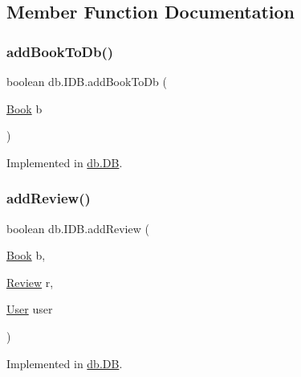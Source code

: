 \subsection{Member Function Documentation}
\mbox{\label{interfacedb_1_1_i_d_b_a63904b26597f651ea6acbd03384e0afb}} 
\subsubsection{\texorpdfstring{add\+Book\+To\+Db()}{addBookToDb()}}
{\footnotesize\ttfamily boolean db.\+I\+D\+B.\+add\+Book\+To\+Db (\begin{DoxyParamCaption}\item[{\hyperlink{classserver_1_1data_1_1_book}{Book}}]{b }\end{DoxyParamCaption})}



Implemented in \hyperlink{classdb_1_1_d_b_a705ed9c0ffae567ec3ac09fbd7138c6f}{db.\+DB}.

\mbox{\label{interfacedb_1_1_i_d_b_a00a453c6d4fc604615f5a173d86600fc}} 
\subsubsection{\texorpdfstring{add\+Review()}{addReview()}}
{\footnotesize\ttfamily boolean db.\+I\+D\+B.\+add\+Review (\begin{DoxyParamCaption}\item[{\hyperlink{classserver_1_1data_1_1_book}{Book}}]{b,  }\item[{\hyperlink{classserver_1_1data_1_1_review}{Review}}]{r,  }\item[{\hyperlink{classserver_1_1data_1_1_user}{User}}]{user }\end{DoxyParamCaption})}



Implemented in \hyperlink{classdb_1_1_d_b_accfa7c2f48252f167576221dc14ff721}{db.\+DB}.

\mbox{\label{interfacedb_1_1_i_d_b_a4d23da2e383e7fe0638089fb2686b6c3}} 
